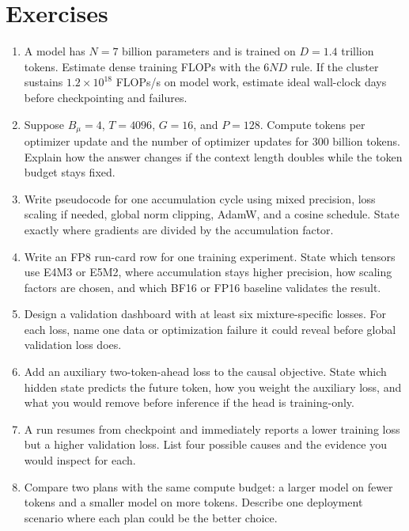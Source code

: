 \section{Exercises}
\label{sec:optimization-exercises}

\begin{enumerate}
\item A model has $N=7$ billion parameters and is trained on $D=1.4$ trillion tokens. Estimate dense training FLOPs with the $6ND$ rule. If the cluster sustains $1.2\times 10^{18}$ FLOPs/s on model work, estimate ideal wall-clock days before checkpointing and failures.
\item Suppose $B_{\mu}=4$, $T=4096$, $G=16$, and $P=128$. Compute tokens per optimizer update and the number of optimizer updates for $300$ billion tokens. Explain how the answer changes if the context length doubles while the token budget stays fixed.
\item Write pseudocode for one accumulation cycle using mixed precision, loss scaling if needed, global norm clipping, AdamW, and a cosine schedule. State exactly where gradients are divided by the accumulation factor.
\item Write an FP8 run-card row for one training experiment. State which tensors use E4M3 or E5M2, where accumulation stays higher precision, how scaling factors are chosen, and which BF16 or FP16 baseline validates the result.
\item Design a validation dashboard with at least six mixture-specific losses. For each loss, name one data or optimization failure it could reveal before global validation loss does.
\item Add an auxiliary two-token-ahead loss to the causal objective. State which hidden state predicts the future token, how you weight the auxiliary loss, and what you would remove before inference if the head is training-only.
\item A run resumes from checkpoint and immediately reports a lower training loss but a higher validation loss. List four possible causes and the evidence you would inspect for each.
\item Compare two plans with the same compute budget: a larger model on fewer tokens and a smaller model on more tokens. Describe one deployment scenario where each plan could be the better choice.
\end{enumerate}
